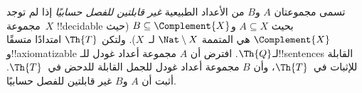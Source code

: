 \documentclass[../../../include/open-logic-section]{subfiles}
\begin{document}
\begin{prob}
تسمى مجموعتان $A$ و$B$ من الأعداد الطبيعية \emph{غير قابلتين للفصل
حسابيًا} إذا لم توجد مجموعة~$X$ !!{decidable} بحيث
$A\subseteq X$ و$B\subseteq\Complement{X}$ (حيث $\Complement{X}$
هي المتممة $\Nat\setminus X$ لـ~$X$). ولتكن $\Th{T}$ امتدادًا متسقًا
و!!{axiomatizable} لـ$\Th{Q}$. افترض أن $A$ مجموعة أعداد غودل
للـ!!{sentence}s القابلة للإثبات في~$\Th{T}$، وأن $B$ مجموعة أعداد
غودل للجمل القابلة للدحض في~$\Th{T}$. أثبت أن $A$ و$B$ غير قابلتين للفصل
حسابيًا.
\end{prob}
\end{document}
